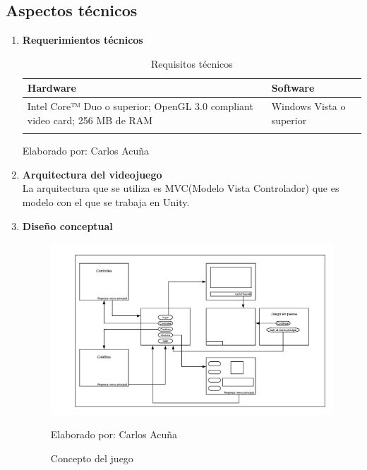 \documentclass[a4paper, openright, 12pt]{report}
\begin{document}
\subsection*{Aspectos técnicos}
\begin{enumerate}
\item \textbf{Requerimientos técnicos} 
\begin{longtable}{| p{5cm} | p{5cm} |}
\hline
\textbf{Hardware} & \textbf{Software}\\ \hline
Intel Core™ Duo o superior; OpenGL 3.0 compliant video card; 256 MB de RAM & Windows Vista o superior\\ \hline
\caption{Requisitos técnicos}
\end{longtable}
\begin{center}
Elaborado por: Carlos Acuña
\end{center}

\item \textbf{Arquitectura del videojuego}\\
La arquitectura que se utiliza es MVC(Modelo Vista Controlador) que es modelo con el que se trabaja en Unity.
\item \textbf{Diseño conceptual}
\begin{figure}[h]
\includegraphics[scale=0.5]{concepto_juego}
\centering
\caption{Concepto del juego}
Elaborado por: Carlos Acuña
\end{figure}
\end{enumerate}
\end{document}
